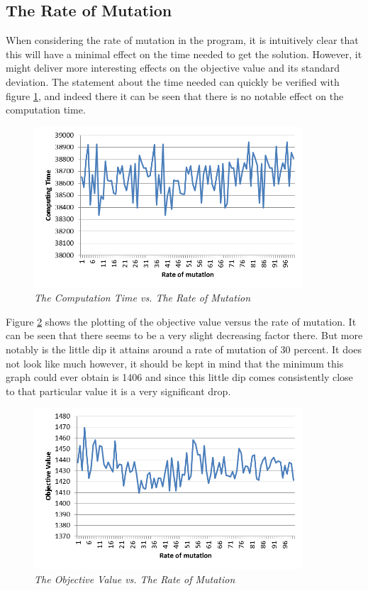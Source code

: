 \subsection{The Rate of Mutation}
When considering the rate of mutation in the program, it is intuitively clear that this will have a minimal effect on the time needed to get the solution. However, it might deliver more interesting effects on the objective value and its standard deviation.
The statement about the time needed can quickly be verified with figure \ref{CTRM}, and indeed there it can be seen that there is no notable effect on the computation time.

\begin{figure}[H] 
	\centering
	\includegraphics[height=6cm]{CTRM}
	\caption{\textsl{The Computation Time vs. The Rate of Mutation}}
	\label{CTRM}
\end{figure}

\par
Figure \ref{OVRM} shows the plotting of the objective value versus the rate of mutation. It can be seen that there seems to be a very slight decreasing factor there. But more notably is the little dip it attains around a rate of mutation of 30 percent. It does not look like much however, it should be kept in mind that the minimum this graph could ever obtain is 1406 and since this little dip comes consistently close to that particular value it is a very significant drop.

\begin{figure}[H] 
	\centering
	\includegraphics[height=6cm]{OVRM}
	\caption{\textsl{The Objective Value vs. The Rate of Mutation}}
	\label{OVRM}
\end{figure}

